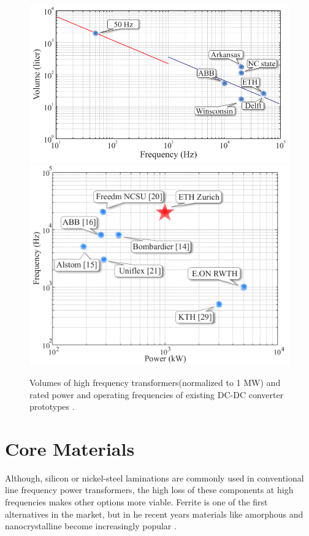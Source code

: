 \documentclass[a4paper, 11pt]{article} %
\begin{document}
\begin{figure}[]
  \centering
    \includegraphics[scale=0.3]{transformer_volume}
    \includegraphics[scale=0.25]{transformer_frequency_commercial_orbitz2010a}
    \caption{Volumes of high frequency transformers(normalized to 1 MW) and rated power and operating frequencies of existing DC-DC converter prototypes \cite{Ortiz2010a,Ortiz2010}.}
  \label{transformer-vols}
\end{figure}


\section{Core Materials}

Although, silicon or nickel-steel laminations are commonly used in conventional line frequency power transformers, the high loss of these components at high frequencies makes other options more viable. Ferrite is one of the first alternatives in the market, but in he recent years materials like amorphous and nanocrystalline become increasingly popular \cite{Agheb2012}.
\end{document}
